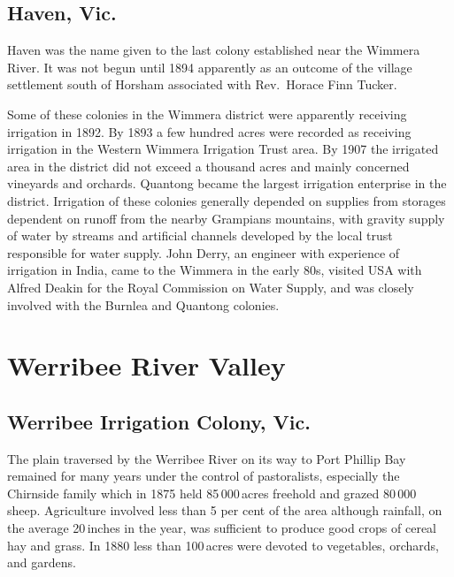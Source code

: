 \subsection*{Haven, Vic.}

Haven was the name given to the last colony established near the
Wimmera River.  It was not begun until 1894
apparently as an outcome of the village settlement south of Horsham
associated with Rev.~Horace Finn Tucker.

Some of these colonies in the Wimmera district
were apparently receiving irrigation in 1892.  By 1893 a few hundred
acres were recorded as receiving irrigation in the Western Wimmera
Irrigation Trust area.  By 1907
the irrigated area in the district did not exceed a thousand acres and
mainly concerned vineyards and
orchards. Quantong became the largest irrigation
enterprise in the district.  Irrigation of these colonies generally
depended on supplies from storages dependent on runoff from the nearby
Grampians mountains, with gravity supply of water by streams and
artificial channels developed by the local
trust responsible for water supply. John Derry, 
an engineer with experience of irrigation in India, came to the
Wimmera in the early 80s, visited USA with Alfred
Deakin for the Royal Commission on Water Supply, and
was closely involved with the Burnlea and Quantong colonies.

\section*{Werribee River Valley}

\subsection*{Werribee Irrigation Colony, Vic.}
 

The plain traversed by the Werribee River on its way to Port Phillip
Bay remained for many years under the control of pastoralists,
especially the Chirnside family which in 1875 held 85\,000\,acres
freehold and grazed 80\,000 sheep.  Agriculture involved
less than 5 per cent of the area although rainfall, on the average
20\,inches in the year, was sufficient to produce good crops of
cereal hay and grass.  In 1880 less than 100\,acres were
devoted to vegetables, orchards, and
gardens.

